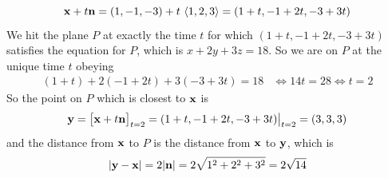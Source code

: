\begin{eg}
\begin{equation*}
\mathbf{x}+t\mathbf{n} = (1,-1,-3) +t\,\left< 1,2,3\right>
         = (1+t, -1+2t, -3+3t)
\end{equation*}
We hit the plane $P$ at exactly the time $t$ for which 
$(1+t, -1+2t, -3+3t)$ satisfies the equation for $P$, which is 
$x+2y+3z=18$. So we are on $P$ at the unique time $t$ obeying
\begin{align*}
(1+t)+2(-1+2t)+3(-3+3t)=18
&\iff 14t = 28 
\iff t=2
\end{align*}
So the point on $P$ which is closest to $\mathbf{x}$ is
\begin{align*}
\mathbf{y} = \big[\mathbf{x}+t\mathbf{n}\big]_{t=2} 
     = (1+t, -1+2t, -3+3t)\big|_{t=2}
     = (3, 3, 3) 
\end{align*}
and the distance from $\mathbf{x}$ to $P$ is the distance from
$\mathbf{x}$ to $\mathbf{y}$, which is
\begin{align*}
|\mathbf{y}-\mathbf{x}| = 2|\mathbf{n}| = 2\sqrt{1^2+2^2+3^2} =2\sqrt{14}
\end{align*}
\end{eg}



